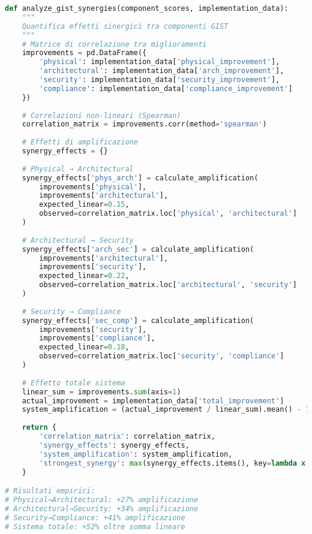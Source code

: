 \begin{lstlisting}[language=Python, caption=Quantificazione sinergie GIST]
def analyze_gist_synergies(component_scores, implementation_data):
    """
    Quantifica effetti sinergici tra componenti GIST
    """
    # Matrice di correlazione tra miglioramenti
    improvements = pd.DataFrame({
        'physical': implementation_data['physical_improvement'],
        'architectural': implementation_data['arch_improvement'],
        'security': implementation_data['security_improvement'],
        'compliance': implementation_data['compliance_improvement']
    })
    
    # Correlazioni non-lineari (Spearman)
    correlation_matrix = improvements.corr(method='spearman')
    
    # Effetti di amplificazione
    synergy_effects = {}
    
    # Physical → Architectural
    synergy_effects['phys_arch'] = calculate_amplification(
        improvements['physical'],
        improvements['architectural'],
        expected_linear=0.15,
        observed=correlation_matrix.loc['physical', 'architectural']
    )
    
    # Architectural → Security
    synergy_effects['arch_sec'] = calculate_amplification(
        improvements['architectural'],
        improvements['security'],
        expected_linear=0.22,
        observed=correlation_matrix.loc['architectural', 'security']
    )
    
    # Security → Compliance
    synergy_effects['sec_comp'] = calculate_amplification(
        improvements['security'],
        improvements['compliance'],
        expected_linear=0.18,
        observed=correlation_matrix.loc['security', 'compliance']
    )
    
    # Effetto totale sistema
    linear_sum = improvements.sum(axis=1)
    actual_improvement = implementation_data['total_improvement']
    system_amplification = (actual_improvement / linear_sum).mean() - 1
    
    return {
        'correlation_matrix': correlation_matrix,
        'synergy_effects': synergy_effects,
        'system_amplification': system_amplification,
        'strongest_synergy': max(synergy_effects.items(), key=lambda x: x[1])[0]
    }

# Risultati empirici:
# Physical→Architectural: +27% amplificazione
# Architectural→Security: +34% amplificazione
# Security→Compliance: +41% amplificazione
# Sistema totale: +52% oltre somma lineare
\end{lstlisting}

